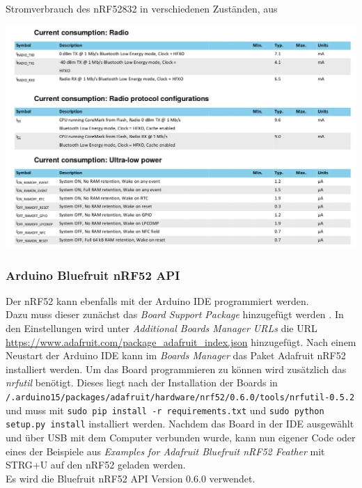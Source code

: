 \begin{table}[h]
  \centering
  \caption{Stromverbrauch des nRF52832 in verschiedenen Zuständen, aus \cite{nordic2017nrf}}
	\includegraphics[width=\textwidth]{images/nrf52consumption.png}
  \label{table:nrf52consumption}
\end{table}


\subsubsection{Arduino Bluefruit nRF52 API}
Der nRF52 kann ebenfalls mit der Arduino IDE programmiert werden.\\
Dazu muss dieser zunächst das \emph{Board Support Package} hinzugefügt werden \cite{townsend2017nrf}.
In den Einstellungen wird unter \textit{Additional Boards Manager URLs} die URL \url{https://www.adafruit.com/package_adafruit_index.json} hinzugefügt.
Nach einem Neustart der Arduino IDE kann im \textit{Boards Manager} das Paket Adafruit nRF52 installiert werden.
Um das Board programmieren zu können wird zusätzlich das \textit{nrfutil} benötigt.
Dieses liegt nach der Installation der Boards in \\\texttt{/.arduino15/packages/adafruit/hardware/nrf52/0.6.0/tools/nrfutil-0.5.2} und muss mit \texttt{sudo pip install -r requirements.txt} und \texttt{sudo python setup.py install} installiert werden.
Nachdem das Board in der IDE ausgewählt und über USB mit dem Computer verbunden wurde, kann nun eigener Code oder eines der Beispiele aus \textit{Examples for Adafruit Bluefruit nRF52 Feather} mit STRG+U auf den nRF52 geladen werden.\\
Es wird die Bluefruit nRF52 API Version 0.6.0 verwendet.



